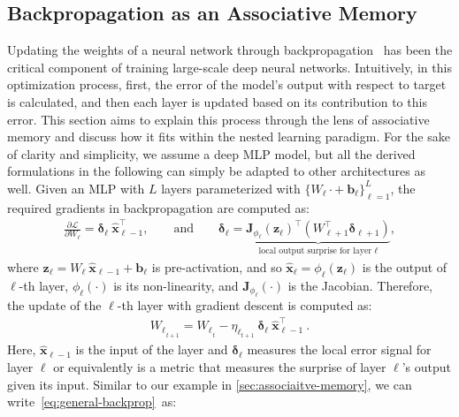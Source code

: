 \documentclass{article}
\newcommand{\citep}{\parencite}
\newcommand{\undermath}[2]{\underset{#1}{\underbrace{#2}}}
\begin{document}
\subsection{Backpropagation as an Associative Memory}\label{sec:backprop-memory-referential}
Updating the weights of a neural network through backpropagation~\citep{linnainmaa1970representation, rumelhart1986learning} has been the critical component of training large-scale deep neural networks. Intuitively, in this optimization process, first, the error of the model's output with respect to target is calculated, and then each layer is updated based on its contribution to this error. This section aims to explain this process through the lens of associative memory and discuss how it fits within the nested learning paradigm. For the sake of clarity and simplicity, we assume a deep MLP model, but all the derived formulations in the following can simply be adapted to other architectures as well. Given an MLP with $L$ layers parameterized with $\{W_{\ell} \cdot + \: \boldsymbol{b}_{\ell}\}_{\ell = 1}^{L}$, the required gradients in backpropagation are computed as:
\begin{align}\label{eq:backprop-delta-jacobian}
     \frac{\partial \mathcal{L}}{\partial W_{\ell}} = \boldsymbol{\delta}_{\ell} \: \hat{\boldsymbol{x}}_{\ell - 1}^{\top}, \qquad \text{and} \qquad \boldsymbol{\delta}_{\ell} = \undermath{\text{local output surprise for layer $\ell$}}{\boldsymbol{J}_{\phi_\ell} \left( \boldsymbol{z}_{\ell} \right)^{\top} \left( W_{\ell+1}^{\top} \boldsymbol{\delta}_{\ell + 1} \right)},
\end{align}
where $\boldsymbol{z}_{\ell} = W_{\ell} \:\hat{\boldsymbol{x}}_{\ell - 1} + \boldsymbol{b}_{\ell}$ is pre-activation, and so  $\hat{\boldsymbol{x}}_{\ell} = \phi_{\ell}\left( \boldsymbol{z}_{\ell}  \right)$ is the output of $\ell$-th layer, $\phi_{\ell}(\cdot)$ is its non-linearity, and $\boldsymbol{J}_{\phi_\ell}(\cdot)$ is the Jacobian. Therefore, the update of the $\ell$-th layer with gradient descent is computed as:
\begin{align}\label{eq:general-backprop}
    {W_{\ell}}_{_{t+1}} = {W_{\ell}}_{_t} - \eta_{\ell_{t+1}} \: \boldsymbol{\delta}_{\ell} \: \hat{\boldsymbol{x}}_{\ell - 1}^{\top}\:.
\end{align}
Here, $\hat{\boldsymbol{x}}_{\ell - 1}$ is the input of the layer and $\boldsymbol{\delta}_\ell$ measures the local error signal for layer $\ell$ or equivalently is a metric that measures the surprise of layer $\ell$'s output given its input. Similar to our example in \autoref{sec:associaitve-memory}, we can write~\autoref{eq:general-backprop}~as:
\end{document}

